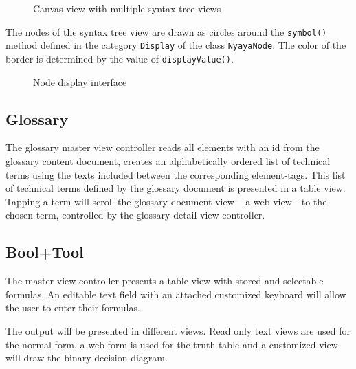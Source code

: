 \begin{figure}[htbp]
\begin{center}
\caption{Canvas view with multiple syntax tree views}
\label{fig:TreeView}
\end{center}
\end{figure}

The nodes of the syntax tree view are drawn as circles around the \verb+symbol()+ 
method defined in the category
\verb+Display+ of the class \verb+NyayaNode+.
The color of the border is determined by the value of \verb+displayValue()+.


\begin{figure}[htbp]
\begin{center}
\caption{Node display interface}
\label{fig:NyayaNodeDisplay}
\end{center}
\end{figure}

\subsection{Glossary}

The glossary master view controller reads all elements with an id from the glossary content document,
creates an alphabetically ordered list of technical terms using the texts included between the corresponding element-tags.
This list of technical terms defined by the glossary document is presented in a table view.
Tapping a term will scroll the glossary document view – a web view - to the chosen term, 
controlled by the glossary detail view controller.

\subsection{Bool+Tool}

The \BoolTool master view controller presents a table view with stored and selectable formulas.
An editable text field with an attached customized keyboard will allow the user to enter their formulas.

The output will be presented in different views. Read only text views are used for the normal form, 
a web form is used for the truth table and a customized view will draw the binary decision diagram.



